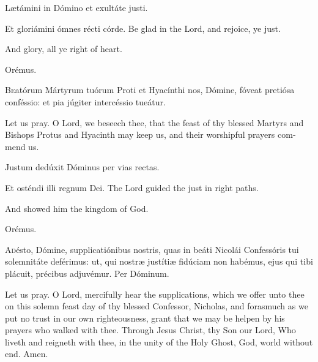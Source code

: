\documentclass[12pt]{article}
\begin{document}
 \begin{paracol}{2}
        Lætámini in Dómino et exultáte justi.

 Et gloriámini ómnes récti córde.
           \switchcolumn
    \noindent    Be glad in the Lord, and rejoice, ye just.
         
\noindent   And glory, all ye right of heart.
    \end{paracol}

   \begin{paracol}{2}
   Orémus.
   
\lettrine{B}{e}atórum Mártyrum tuórum Proti et Hyacínthi nos, Dómine, fóveat pretiósa conféssio: et pia júgiter intercéssio tueátur.
\switchcolumn
\begin{otherlanguage}{english}
\noindent Let us pray. O Lord, we beseech thee, that the feast of thy blessed Martyrs and Bishops Protus and Hyacinth may keep us, and their worshipful prayers commend us.
\end{otherlanguage}
    \end{paracol}
    
      \begin{paracol}{2}
   Justum dedúxit Dóminus per vias rectas.

 Et osténdi illi regnum Dei.
           \switchcolumn
 \noindent           The Lord guided the just in right paths.
                  
\noindent  And showed him the kingdom of God.
    \end{paracol}

   \begin{paracol}{2}
   Orémus.
   
\lettrine{A}{d}ésto, Dómine, supplicatiónibus nostris, quas in beáti Nicolái Confessóris tui solemnitáte deférimus: ut, qui nostræ justítiæ fidúciam non habémus, ejus qui tibi plácuit, précibus adjuvémur.
Per Dóminum.
\switchcolumn
\begin{otherlanguage}{english}
\noindent Let us pray. O Lord, mercifully hear the supplications, which we offer unto thee on this solemn feast day of thy blessed Confessor, Nicholas, and forasmuch as we put no trust in our own righteousness, grant that we may be helpen by his prayers who walked with thee. Through Jesus Christ, thy Son our Lord, Who liveth and reigneth with thee, in the unity of the Holy Ghost, God, world without end.  Amen.
\end{otherlanguage}
    \end{paracol}
\end{document}
